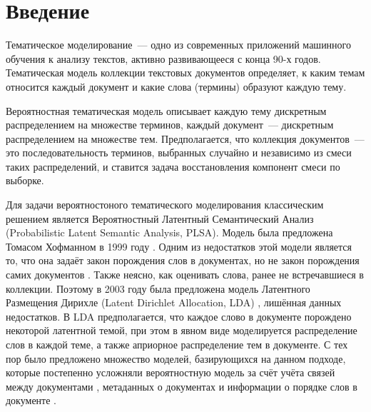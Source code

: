\documentclass[12pt, twoside]{article}
\begin{document}

\maketitle
\linenumbers

\newcommand{\norm}{\mathop{\mathsf{norm}}\limits}

\section{Введение}

Тематическое моделирование~--- одно из современных приложений машинного обучения к анализу текстов, активно развивающееся с конца 90-х годов. Тематическая модель коллекции текстовых документов определяет, к каким темам относится каждый документ и какие слова (термины) образуют каждую тему.

Вероятностная тематическая модель описывает каждую тему дискретным распределением на множестве терминов, каждый документ~--- дискретным распределением на множестве тем. Предполагается, что коллекция документов~--- это последовательность терминов, выбранных случайно и независимо из смеси таких распределений, и ставится задача восстановления компонент смеси по выборке.

Для  задачи вероятностоного тематического моделирования  классическим решением является Вероятностный Латентный Семантический Анализ (Probabilistic Latent Semantic Analysis, PLSA). Модель  была предложена Томасом Хофманном в 1999 году \cite{hofmann1999probabilistic}. Одним из недостатков этой модели является то, что она задаёт закон порождения слов в документах, но не закон порождения самих документов \cite{plsaminus}. Также  неясно, как оценивать слова, ранее не встречавшиеся в коллекции. Поэтому в 2003 году была предложена модель Латентного Размещения Дирихле (Latent Dirichlet Allocation, LDA) \cite{blei2003latent}, лишённая данных недостатков. В LDA предполагается, что каждое слово в документе порождено некоторой латентной темой, при этом в явном виде моделируется распределение слов в каждой теме, а также априорное
распределение тем в документе. С тех пор было предложено множество моделей, базирующихся на данном подходе, которые постепенно усложняли вероятностную модель за счёт учёта связей между документами \cite{cohn2001missing,mccallum2005author,nallapati2008link}, метаданных о документах \cite{steyvers2004probabilistic} и информации о порядке слов в документе \cite{gruber2007hidden,wallach2006topic}.
\end{document}
